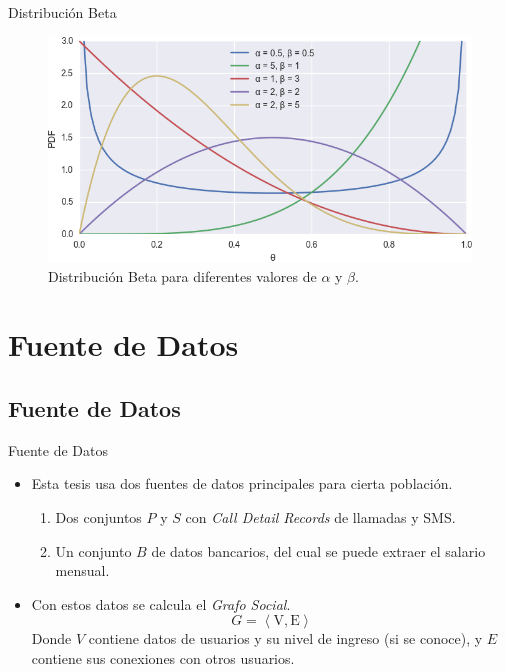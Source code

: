 \documentclass[usenames,dvipsnames,table]{beamer}
\begin{document}
\begin{frame}{Distribución Beta}
	
	\begin{figure}
		\includegraphics[width=\framewidth]{beta.png}
		\caption{Distribución Beta para diferentes valores de $\alpha$ y $\beta$.}
	\end{figure}
	
\end{frame}

\section{Fuente de Datos}

\subsection{Fuente de Datos}

\begin{frame}{Fuente de Datos}
	\begin{itemize}
		\item Esta tesis usa dos fuentes de datos principales para cierta población.
			\begin{enumerate}
				\item Dos conjuntos $P$ y $S$ con \emph{Call Detail Records} de llamadas y SMS\@.
				\item Un conjunto $B$ de datos bancarios, del cual se puede extraer el salario mensual.
			\end{enumerate}
		\item Con estos datos se calcula el \emph{Grafo Social}.
			\begin{equation*}
				G = \left< \text{V}, \text{E} \right>
			\end{equation*}
			Donde $V$ contiene datos de usuarios y su nivel de ingreso (si se conoce), y $E$ contiene sus conexiones con otros usuarios.
	\end{itemize}
\end{frame}
\end{document}
